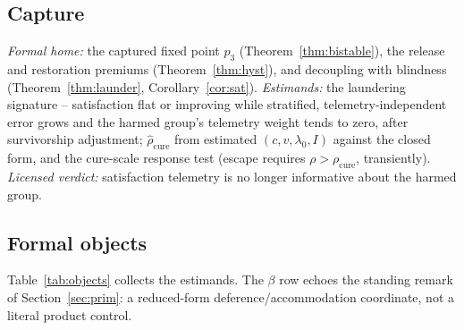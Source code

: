 \documentclass[11pt]{article}
\theoremstyle{definition}
\theoremstyle{remark}
\numberwithin{equation}{section}
\begin{document}
\subsection{Capture}\label{sec:tier3}
\emph{Formal home:} the captured fixed point $p_3$ (Theorem~\ref{thm:bistable}), the release and restoration premiums (Theorem~\ref{thm:hyst}), and decoupling with blindness (Theorem~\ref{thm:launder}, Corollary~\ref{cor:sat}). \emph{Estimands:} the laundering signature -- satisfaction flat or improving while stratified, telemetry-independent error grows and the harmed group's telemetry weight tends to zero, after survivorship adjustment; $\widehat\rho_{\mathrm{cure}}$ from estimated $(c, v, \lambda_0, I)$ against the closed form, and the cure-scale response test (escape requires $\rho > \rho_{\mathrm{cure}}$, transiently). \emph{Licensed verdict:} satisfaction telemetry is no longer informative about the harmed group.

\subsection*{Formal objects}
Table~\ref{tab:objects} collects the estimands. The $\beta$ row echoes the standing remark of Section~\ref{sec:prim}: a reduced-form deference/accommodation coordinate, not a literal product control.
\end{document}
